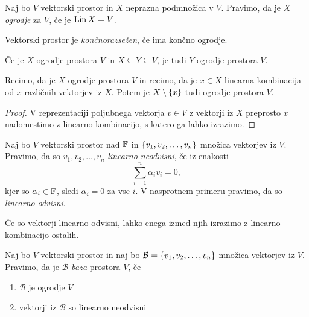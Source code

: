 \documentclass[12pt, a4paper]{article}
\begin{document}
\begin{definicija}
Naj bo $V$ vektorski prostor in $X$ neprazna podmnožica v $V$. Pravimo, da je $X$ \emph{ogrodje} za $V$, če je $\operatorname{Lin} X=V$.
\end{definicija}

\begin{okvir}
\begin{definicija}
Vektorski prostor je \emph{končnorazsežen}, če ima končno ogrodje.
\end{definicija}
\end{okvir}

\begin{trditev}
Če je $X$ ogrodje prostora $V$ in $X\subseteq Y\subseteq V$, je tudi $Y$ ogrodje prostora $V$.
\end{trditev}

\obvs

\begin{trditev}\label{td:ogrodja}
Recimo, da je $X$ ogrodje prostora $V$ in recimo, da je $x\in X$ linearna kombinacija od $x$ različnih vektorjev iz $X$. Potem je $X\setminus\left\{x\right\}$ tudi ogrodje prostora $V$.
\end{trditev}

\begin{proof}
V reprezentaciji poljubnega vektorja $v\in V$ z vektorji iz $X$ preprosto $x$ nadomestimo z linearno kombinacijo, s katero ga lahko izrazimo.
\end{proof}

\begin{definicija}
Naj bo $V$ vektorski prostor nad $\mathbb{F}$ in $\left\{v_1,v_2,\dots,v_n\right\}$ množica vektorjev iz $V$. Pravimo, da so $v_1,v_2,\dots,v_n$ \emph{linearno neodvisni}, če iz enakosti
\[
\sum_{i=1}^n\alpha_iv_i=0,
\]
kjer so $\alpha_i\in\mathbb{F}$, sledi $\alpha_i=0$ za vse $i$. V nasprotnem primeru pravimo, da so \emph{linearno odvisni}.
\end{definicija}

\begin{opomba}
Če so vektorji linearno odvisni, lahko enega izmed njih izrazimo z linearno kombinacijo ostalih.
\end{opomba}

\begin{okvir}
\begin{definicija}
Naj bo $V$ vektorski prostor in naj bo $\mathcal{B}=\left\{v_1,v_2,\dots,v_n\right\}$ množica vektorjev iz $V$. Pravimo, da je $\mathcal{B}$ \emph{baza} prostora $V$, če

\begin{enumerate}[label=\roman*)]
\item $\mathcal{B}$ je ogrodje $V$
\item vektorji iz $\mathcal{B}$ so linearno neodvisni
\end{enumerate}
\end{definicija}
\end{okvir}
\end{document}
